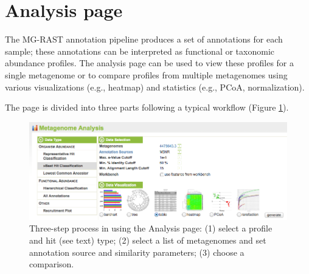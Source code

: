 \documentclass[12pt,fullpage]{report}
\begin{document}
\section{Analysis page}
\label{section:analysis-page}

The MG-RAST annotation pipeline produces a set of annotations for each sample; these annotations can be interpreted as functional or taxonomic abundance profiles. The analysis page can be used to view these profiles for a single metagenome or to compare profiles from multiple metagenomes using various visualizations (e.g., heatmap) and statistics (e.g., PCoA, normalization).

The page is divided into three parts following a typical workflow (Figure \ref{fig:analysis-page}).

\begin{figure}
\begin{center}
\includegraphics[width=6in]{Images/analysis-page.png}
\end{center}
\caption{
Three-step process in using the Analysis page: (1) select a profile and hit (see text) type; (2) select a list of metagenomes and set annotation source and similarity parameters; (3) choose a comparison.
}
\label{fig:analysis-page}
\end{figure}
\end{document}
